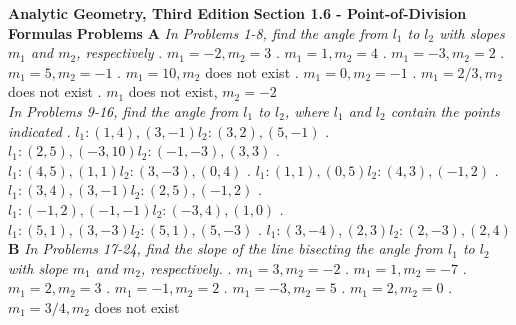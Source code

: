 \documentclass[10pt,letterpaper]{article}
\begin{document}
\textbf{Analytic Geometry, Third Edition}
\textbf{Section 1.6 - Point-of-Division Formulas}
\newline \textbf{Problems}
\newline \textbf{A}
\newline \textit{In Problems 1-8, find the angle from $l_1$ to $l_2$ with slopes $m_1$ and $m_2$, respectively}
. $m_1=-2, m_2=3$
. $m_1=1, m_2=4$
. $m_1=-3, m_2=2$
. $m_1=5, m_2=-1$
. $m_1=10, m_2$ does not exist
. $m_1=0, m_2=-1$
. $m_1=2/3, m_2$ does not exist
. $m_1$ does not exist, $m_2=-2$
\\
\newline \textit{In Problems 9-16, find the angle from $l_1$ to $l_2$, where $l_1$ and $l_2$ contain the points indicated}
. $l_1:(1,4), (3,-1) l_2:(3,2),(5,-1)$
. $l_1:(2,5),(-3,10) l_2:(-1,-3),(3,3)$
. $l_1:(4,5),(1,1) l_2:(3,-3),(0,4)$
. $l_1:(1,1),(0,5) l_2:(4,3),(-1,2)$
. $l_1:(3,4),(3,-1) l_2:(2,5),(-1,2)$
. $l_1:(-1,2),(-1,-1) l_2:(-3,4),(1,0)$
. $l_1:(5,1),(3,-3) l_2:(5,1),(5,-3)$
. $l_1:(3,-4),(2,3) l_2:(2,-3),(2,4)$
\\
\newline \textbf{B}
\newline \textit{In Problems 17-24, find the slope of the line bisecting the angle from $l_1$ to $l_2$ with slope $m_1$ and $m_2$, respectively.}
. $m_1=3, m_2=-2$
. $m_1=1, m_2=-7$
. $m_1=2, m_2=3$
. $m_1=-1, m_2=2$
. $m_1=-3, m_2=5$
. $m_1=2, m_2=0$
. $m_1=3/4, m_2$ does not exist
\end{document}
